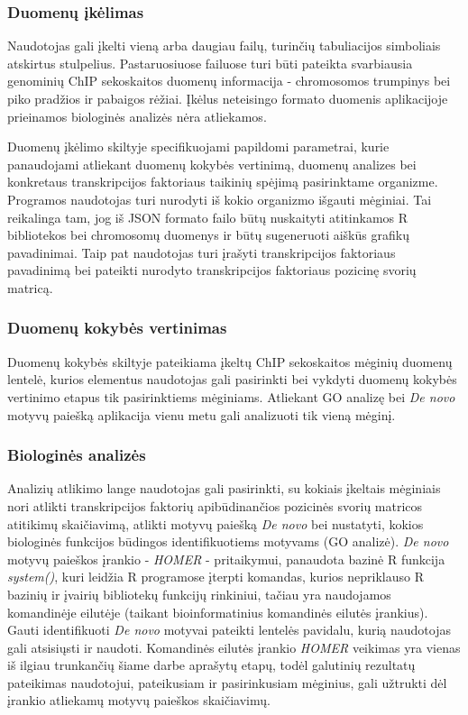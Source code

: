 \documentclass[12pt]{article}
\begin{document}
\subsubsection*{Duomenų įkėlimas}
Naudotojas gali įkelti vieną arba daugiau failų, turinčių tabuliacijos
simboliais atskirtus stulpelius. Pastaruosiuose failuose turi būti pateikta
svarbiausia genominių ChIP sekoskaitos duomenų informacija - chromosomos
trumpinys bei piko pradžios ir pabaigos rėžiai. Įkėlus neteisingo formato
duomenis aplikacijoje prieinamos biologinės analizės nėra atliekamos.

Duomenų įkėlimo skiltyje specifikuojami papildomi parametrai, kurie panaudojami
atliekant duomenų kokybės vertinimą, duomenų analizes bei konkretaus
transkripcijos faktoriaus taikinių spėjimą pasirinktame organizme. Programos
naudotojas turi nurodyti iš kokio organizmo išgauti mėginiai. Tai reikalinga
tam, jog iš JSON formato failo būtų nuskaityti atitinkamos R bibliotekos bei
chromosomų duomenys ir būtų sugeneruoti aiškūs grafikų pavadinimai. Taip pat
naudotojas turi įrašyti transkripcijos faktoriaus pavadinimą bei pateikti
nurodyto transkripcijos faktoriaus pozicinę svorių matricą.

\subsubsection*{Duomenų kokybės vertinimas}
Duomenų kokybės skiltyje pateikiama įkeltų ChIP sekoskaitos mėginių duomenų
lentelė, kurios elementus naudotojas gali pasirinkti bei vykdyti duomenų
kokybės vertinimo etapus tik pasirinktiems mėginiams. Atliekant GO analizę bei
\emph{De novo} motyvų paiešką aplikacija vienu metu gali analizuoti tik vieną
mėginį.

\subsubsection*{Biologinės analizės}
Analizių atlikimo lange naudotojas gali pasirinkti, su kokiais įkeltais
mėginiais nori atlikti transkripcijos faktorių apibūdinančios pozicinės
svorių matricos atitikimų skaičiavimą, atlikti motyvų paiešką \emph{De novo}
bei nustatyti, kokios biologinės funkcijos būdingos identifikuotiems motyvams
(GO analizė). \emph{De novo} motyvų paieškos įrankio - \emph{HOMER} -
pritaikymui, panaudota bazinė R funkcija \emph{system()}, kuri leidžia
R programose įterpti komandas, kurios nepriklauso R bazinių ir įvairių
bibliotekų funkcijų rinkiniui, tačiau yra naudojamos komandinėje eilutėje
(taikant bioinformatinius komandinės eilutės įrankius). Gauti identifikuoti
\emph{De novo} motyvai pateikti lentelės pavidalu, kurią naudotojas gali
atsisiųsti ir naudoti. Komandinės eilutės įrankio \emph{HOMER} veikimas yra
vienas iš ilgiau trunkančių šiame darbe aprašytų etapų, todėl galutinių
rezultatų pateikimas naudotojui, pateikusiam ir pasirinkusiam mėginius, gali
užtrukti dėl įrankio atliekamų motyvų paieškos skaičiavimų. 
\end{document}
